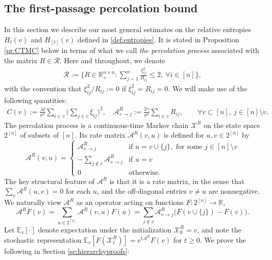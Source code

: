 \documentclass[11pt,reqno]{amsart}
\numberwithin{equation}{section}
\theoremstyle{definition}
\def\CC{{C}}
\def\A{{\mathcal A}}
\def\E{{\mathbb E}}
\def\R{{\mathbb R}}
\def\X{{\mathcal X}}
\begin{document}
\subsection{The first-passage percolation bound} \label{sec:CTMC.main.result}




In this section we describe our most general estimates on the relative entropies $H_t(v)$ and $H_{[t]}(v)$ defined in \eqref{def:entropies}. It is stated in Proposition \ref{pr:CTMC} below in terms of what we call \emph{the percolation process} associated with the matrix $R \in \mathcal{R}$. Here and throughout,  we denote 
\begin{align} \label{eq:def.control.set}
 \mathcal{R} := \bigg\{ R \in \R^{n \times n}_+ : \sum_{j=1}^n \frac{\xi_{ij}^2 }{R_{ij}} \le 2, \ \forall i \in [n]\bigg\},
\end{align}
with the convention that $\xi_{ij}^2/R_{ij}:=0$ if $\xi_{ij}^2=R_{ij}=0$.
We will make use of the following quantities:
\begin{align} \label{eq:def.C(v).D(v)}
	\CC(v) := \frac{M}{\sigma^2} \sum_{i \in v} \bigg(\sum_{j \in v} \xi_{ij} \bigg)^2, \quad \A_{v \to j}^{R} := \frac{2\gamma}{\sigma^2} \sum_{i \in v} R_{ij},  \qquad \forall v\subset [n], \ j \in [n] \setminus v.
\end{align}
The percolation process is a continuous-time Markov chain $\X^{R}$ on the state space $2^{[n]}$ of subsets of $[n]$. Its rate matrix $\A^{R}(v,u)$ is defined for $u,v \in 2^{[n]}$ by
\begin{equation}
\A^{R}(v,u) = \begin{cases}\A^{R}_{v \to j} &\text{if } u=v \cup \{j\},  \text{ for some } j \in [n] \setminus v \\  - \sum_{j \notin v} \A^{R}_{v \to j} &\text{if } u=v \\   0 &\text{otherwise}. \end{cases} \label{rate.matrix}
\end{equation}
The key structural feature of $\A^{R}$ is that it is a rate matrix, in the sense that $\sum_v \A^{R}(u,v)=0$ for each $u$, and the off-diagonal entries $v \neq u$ are nonnegative. We naturally view $\A^{R}$ as an operator acting on functions $F : 2^{[n]}\to\R$, 
\[
\A^{R} F(v) = \sum_{u \in 2^{[n]}}\A^{R}(v,u)F(u) = \sum_{j \notin v}\A^{R}_{v\to j}\big(F(v \cup \{j\}) - F(v)\big).
\]
Let $\E_v[\cdot]$ denote expectation under the initialization $\X^{R}_0=v$, and note the stochastic representation $\E_v[F(\X^{R}_t)] = e^{t\A^{R}}F(v)$ for $t \ge 0$.
We prove the following in Section \ref{se:hierarchyproofs}:
\end{document}
